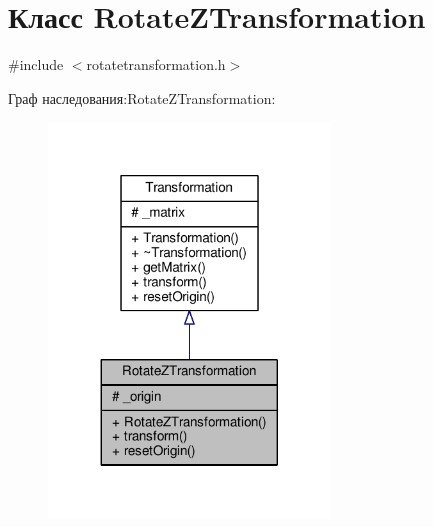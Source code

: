 \hypertarget{class_rotate_z_transformation}{}\section{Класс Rotate\+Z\+Transformation}
\label{class_rotate_z_transformation}


{\ttfamily \#include $<$rotatetransformation.\+h$>$}



Граф наследования\+:Rotate\+Z\+Transformation\+:
\nopagebreak
\begin{figure}[H]
\begin{center}
\leavevmode
\includegraphics[width=212pt]{d2/ddd/class_rotate_z_transformation__inherit__graph}
\end{center}
\end{figure}


